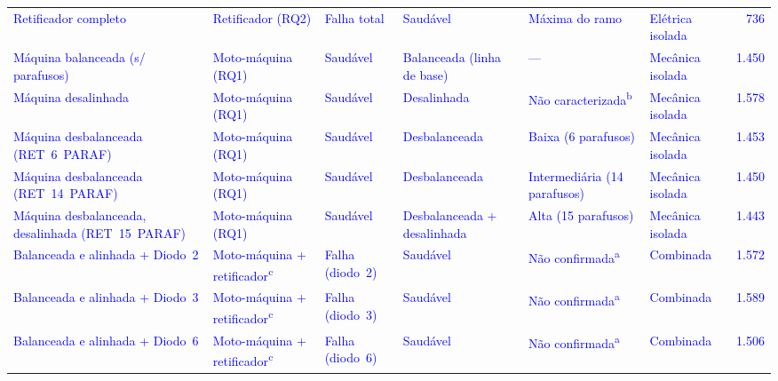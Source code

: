 \documentclass[times,final]{elsarticle}
\begin{document}
\begin{table}[H]
\begin{tabular}{@{}p{3.4cm}p{1.9cm}p{2.0cm}p{2.3cm}p{1.7cm}p{1.7cm}r@{}}
        \textcolor{blue}{Retificador completo} & \textcolor{blue}{Retificador (RQ2)} & \textcolor{blue}{Falha total} & \textcolor{blue}{Saudável} & \textcolor{blue}{Máxima do ramo} & \textcolor{blue}{Elétrica isolada} & \textcolor{blue}{736} \\
        \addlinespace
        \textcolor{blue}{Máquina balanceada (s/ parafusos)} & \textcolor{blue}{Moto-máquina (RQ1)} & \textcolor{blue}{Saudável} & \textcolor{blue}{Balanceada (linha de base)} & \textcolor{blue}{---} & \textcolor{blue}{Mecânica isolada} & \textcolor{blue}{1.450} \\
        \textcolor{blue}{Máquina desalinhada} & \textcolor{blue}{Moto-máquina (RQ1)} & \textcolor{blue}{Saudável} & \textcolor{blue}{Desalinhada} & \textcolor{blue}{Não caracterizada\textsuperscript{b}} & \textcolor{blue}{Mecânica isolada} & \textcolor{blue}{1.578} \\
        \textcolor{blue}{Máquina desbalanceada (RET~6~PARAF)} & \textcolor{blue}{Moto-máquina (RQ1)} & \textcolor{blue}{Saudável} & \textcolor{blue}{Desbalanceada} & \textcolor{blue}{Baixa (6 parafusos)} & \textcolor{blue}{Mecânica isolada} & \textcolor{blue}{1.453} \\
        \textcolor{blue}{Máquina desbalanceada (RET~14~PARAF)} & \textcolor{blue}{Moto-máquina (RQ1)} & \textcolor{blue}{Saudável} & \textcolor{blue}{Desbalanceada} & \textcolor{blue}{Intermediária (14 parafusos)} & \textcolor{blue}{Mecânica isolada} & \textcolor{blue}{1.450} \\
        \textcolor{blue}{Máquina desbalanceada, desalinhada (RET~15~PARAF)} & \textcolor{blue}{Moto-máquina (RQ1)} & \textcolor{blue}{Saudável} & \textcolor{blue}{Desbalanceada + desalinhada} & \textcolor{blue}{Alta (15 parafusos)} & \textcolor{blue}{Mecânica isolada} & \textcolor{blue}{1.443} \\
        \addlinespace
        \textcolor{blue}{Balanceada e alinhada + Diodo~2} & \textcolor{blue}{Moto-máquina + retificador\textsuperscript{c}} & \textcolor{blue}{Falha (diodo~2)} & \textcolor{blue}{Saudável} & \textcolor{blue}{Não confirmada\textsuperscript{a}} & \textcolor{blue}{Combinada} & \textcolor{blue}{1.572} \\
        \textcolor{blue}{Balanceada e alinhada + Diodo~3} & \textcolor{blue}{Moto-máquina + retificador\textsuperscript{c}} & \textcolor{blue}{Falha (diodo~3)} & \textcolor{blue}{Saudável} & \textcolor{blue}{Não confirmada\textsuperscript{a}} & \textcolor{blue}{Combinada} & \textcolor{blue}{1.589} \\
        \textcolor{blue}{Balanceada e alinhada + Diodo~6} & \textcolor{blue}{Moto-máquina + retificador\textsuperscript{c}} & \textcolor{blue}{Falha (diodo~6)} & \textcolor{blue}{Saudável} & \textcolor{blue}{Não confirmada\textsuperscript{a}} & \textcolor{blue}{Combinada} & \textcolor{blue}{1.506} \\

\end{tabular}
\end{table}
\end{document}

